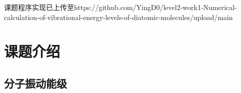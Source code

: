 \documentclass[11pt, a4paper, oneside]{ctexart}
\begin{document}
\vspace{45mm}\begin{center}
    \footnotesize{课题程序实现已上传至}\tiny{https://github.com/YingD0/level2-work1-Numerical-calculation-of-vibrational-energy-levels-of-diatomic-molecules/upload/main}
        
\end{center}

\newpage
{}
\setcounter{page}{1}
\tableofcontents
\newpage
\setcounter{page}{1}

\section{课题介绍}
\subsection{分子振动能级}
\end{document}
